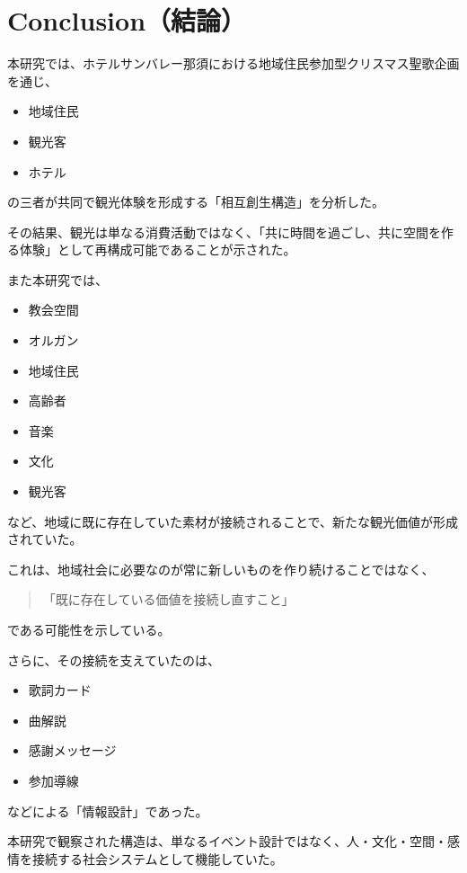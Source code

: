 \section{Conclusion（結論）}

本研究では、ホテルサンバレー那須における地域住民参加型クリスマス聖歌企画を通じ、

\begin{itemize}
\item 地域住民
\item 観光客
\item ホテル
\end{itemize}

の三者が共同で観光体験を形成する「相互創生構造」を分析した。

その結果、観光は単なる消費活動ではなく、「共に時間を過ごし、共に空間を作る体験」として再構成可能であることが示された。

また本研究では、

\begin{itemize}
\item 教会空間
\item オルガン
\item 地域住民
\item 高齢者
\item 音楽
\item 文化
\item 観光客
\end{itemize}

など、地域に既に存在していた素材が接続されることで、新たな観光価値が形成されていた。

これは、地域社会に必要なのが常に新しいものを作り続けることではなく、

\begin{quote}
「既に存在している価値を接続し直すこと」
\end{quote}

である可能性を示している。

さらに、その接続を支えていたのは、

\begin{itemize}
\item 歌詞カード
\item 曲解説
\item 感謝メッセージ
\item 参加導線
\end{itemize}

などによる「情報設計」であった。

本研究で観察された構造は、単なるイベント設計ではなく、人・文化・空間・感情を接続する社会システムとして機能していた。

